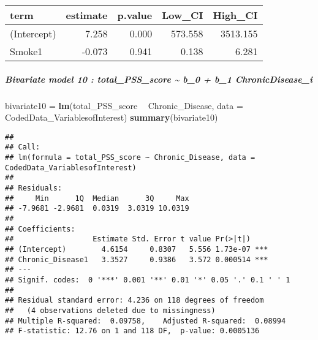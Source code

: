 \documentclass[]{article}
\newenvironment{Shaded}{\begin{snugshade}}{\end{snugshade}}
\newcommand{\DataTypeTok}[1]{\textcolor[rgb]{0.13,0.29,0.53}{#1}}
\newcommand{\DecValTok}[1]{\textcolor[rgb]{0.00,0.00,0.81}{#1}}
\newcommand{\FloatTok}[1]{\textcolor[rgb]{0.00,0.00,0.81}{#1}}
\newcommand{\KeywordTok}[1]{\textcolor[rgb]{0.13,0.29,0.53}{\textbf{#1}}}
\newcommand{\NormalTok}[1]{#1}
\newcommand{\OperatorTok}[1]{\textcolor[rgb]{0.81,0.36,0.00}{\textbf{#1}}}
\newcommand{\StringTok}[1]{\textcolor[rgb]{0.31,0.60,0.02}{#1}}
\let\oldsubparagraph\subparagraph
\renewcommand{\subparagraph}[1]{\oldsubparagraph{#1}\mbox{}}
\begin{document}
\begin{longtable}[]{@{}lrrrr@{}}
\toprule
term & estimate & p.value & Low\_CI & High\_CI\tabularnewline
\midrule
\endhead
(Intercept) & 7.258 & 0.000 & 573.558 & 3513.155\tabularnewline
Smoke1 & -0.073 & 0.941 & 0.138 & 6.281\tabularnewline
\bottomrule
\end{longtable}

\hypertarget{bivariate-model-10-total_pss_score-b_0-b_1-chronicdisease_i}{%
\subparagraph{Bivariate model 10 : total\_PSS\_score \textasciitilde{}
b\_0 + b\_1
ChronicDisease\_i}\label{bivariate-model-10-total_pss_score-b_0-b_1-chronicdisease_i}}

\begin{Shaded}
\begin{Highlighting}[]
\NormalTok{bivariate10 =}\StringTok{ }\KeywordTok{lm}\NormalTok{(total_PSS_score }\OperatorTok{~}\StringTok{ }\NormalTok{Chronic_Disease, }\DataTypeTok{data =}\NormalTok{ CodedData_VariablesofInterest)}
\KeywordTok{summary}\NormalTok{(bivariate10)}
\end{Highlighting}
\end{Shaded}

\begin{verbatim}
## 
## Call:
## lm(formula = total_PSS_score ~ Chronic_Disease, data = CodedData_VariablesofInterest)
## 
## Residuals:
##     Min      1Q  Median      3Q     Max 
## -7.9681 -2.9681  0.0319  3.0319 10.0319 
## 
## Coefficients:
##                  Estimate Std. Error t value Pr(>|t|)    
## (Intercept)        4.6154     0.8307   5.556 1.73e-07 ***
## Chronic_Disease1   3.3527     0.9386   3.572 0.000514 ***
## ---
## Signif. codes:  0 '***' 0.001 '**' 0.01 '*' 0.05 '.' 0.1 ' ' 1
## 
## Residual standard error: 4.236 on 118 degrees of freedom
##   (4 observations deleted due to missingness)
## Multiple R-squared:  0.09758,    Adjusted R-squared:  0.08994 
## F-statistic: 12.76 on 1 and 118 DF,  p-value: 0.0005136
\end{verbatim}

\begin{Shaded}
\end{Shaded}
\end{document}
